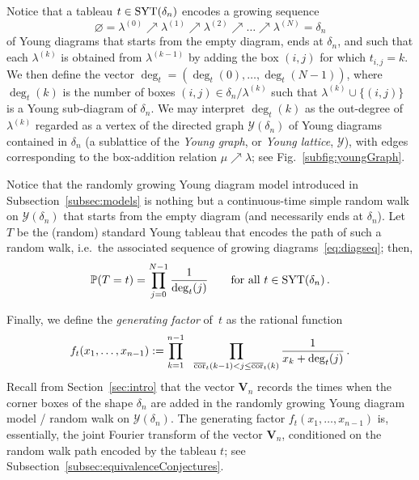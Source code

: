 \documentclass[a4paper,reqno,12pt]{amsart}
\theoremstyle{plain}
\theoremstyle{definition}
\newcommand{\firstmention}{\emph}
\newcommand{\syt}{\textnormal{SYT}}
\newcommand{\staircase}{\delta}
\newcommand{\young}{\mathcal{Y}}
\newcommand{\diag}{\textnormal{cor}}
\newcommand{\diagsorted}{\overline{\diag}}
\renewcommand{\P}{\mathbb{P}}
\newcommand{\1}{\mathbbm{1}}
\renewcommand{\emptyset}{\varnothing}
\begin{document}
Notice that a tableau $t \in \syt(\staircase_n)$ encodes a growing sequence
\begin{equation}
\label{eq:diagseq}
\emptyset = \lambda^{(0)} \nearrow \lambda^{(1)}
\nearrow \lambda^{(2)} \nearrow \ldots \nearrow \lambda^{(N)}=
\staircase_n
\end{equation}
of Young diagrams that starts from the empty diagram, ends at $\staircase_n$, and such that each $\lambda^{(k)}$ is obtained from $\lambda^{(k-1)}$ by adding the box $(i,j)$ for which $t_{i,j}=k$.
We then define the vector $\deg_t = (\deg_t(0),\ldots,\deg_t(N-1))$, where $\deg_t(k)$ is the number of boxes $(i,j)\in \staircase_n / \lambda^{(k)}$ such that $\lambda^{(k)} \cup \{(i,j)\}$ is a Young sub-diagram of $\staircase_n$.
We may interpret $\deg_t(k)$ as the out-degree of $\lambda^{(k)}$ regarded as a vertex of the directed graph $\young(\staircase_n)$ of Young diagrams contained in $\staircase_n$ (a sublattice of the \firstmention{Young graph}, or \firstmention{Young lattice}, $\mathcal{Y}$), with edges corresponding to the box-addition relation $\mu \nearrow \lambda$; see Fig.~\ref{subfig:youngGraph}.

Notice that the randomly growing Young diagram model introduced in Subsection~\ref{subsec:models} is nothing but a continuous-time simple random walk on $\young(\staircase_n)$ that starts from the empty diagram (and necessarily ends at $\staircase_n$).
Let $T$ be the (random) standard Young tableau that encodes the path of such a random walk, i.e.\ the associated sequence of growing diagrams~\eqref{eq:diagseq}; then,
\begin{equation}
\label{eq:deg_t}
\P(\nobreak{T=t}) = \prod_{j=0}^{N-1} \frac{1}{\deg_t(j)}
\qquad
\text{for all } t\in\syt(\staircase_n) \, .
\end{equation}

Finally, we define the \firstmention{generating factor} of~$t$ as the rational function
\begin{equation}
f_t(x_1,\ldots,x_{n-1}) :=
\prod_{k=1}^{n-1} \ \ \prod_{\diagsorted_t(k-1) < j \le \diagsorted_t(k)} \frac{1}{x_k + \deg_t(j)} \, .
\label{eq:f_t}
\end{equation}
Recall from Section~\ref{sec:intro} that the vector $\bm{V}_n$ records the times when the corner boxes of the shape $\delta_n$ are added in the randomly growing Young diagram model / random walk on $\young(\staircase_n)$.
The generating factor $f_t(x_1,\dots,x_{n-1})$  is, essentially, the joint Fourier transform of the vector $\bm{V}_n$, conditioned on the random walk path encoded by the tableau $t$; see Subsection~\ref{subsec:equivalenceConjectures}.
\end{document}
